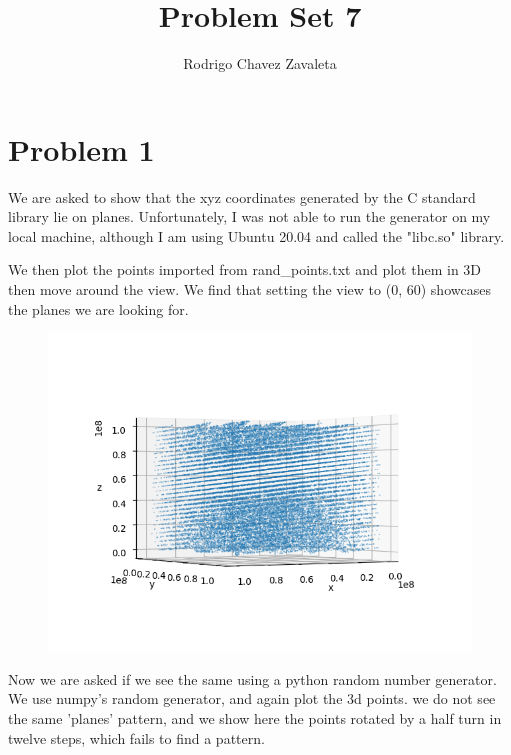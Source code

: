 \documentclass[]{article}
\title{Problem Set 7}
\author{Rodrigo Chavez Zavaleta}
\begin{document}
\maketitle

\section{Problem 1}
We are asked to show that the xyz coordinates generated by the C standard library lie on planes. Unfortunately, I was not able to run the generator on my local machine, although I am using Ubuntu 20.04 and called the "libc.so" library.

We then plot the points imported from rand\_points.txt and plot them in 3D then move around the view. We find that setting the view to (0, 60) showcases the planes we are looking for.
\begin{figure}[h]
	\centering
	\includegraphics[width=0.8\linewidth]{Results/q1a.png}
\end{figure}

Now we are asked if we see the same using a python random number generator. We use numpy's random generator, and again plot the 3d points. we do not see the same 'planes' pattern, and we show here the points rotated by a half turn in twelve steps, which fails to find a pattern.
\end{document}
